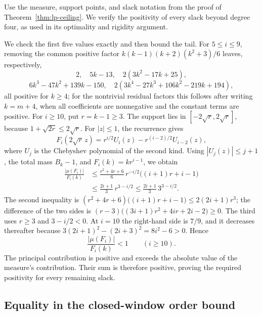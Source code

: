 \documentclass[a4paper,10pt,reqno]{amsart}
\theoremstyle{plain}
\theoremstyle{definition}
\theoremstyle{remark}
\begin{document}
Use the measure, support points, and slack notation from the proof of
Theorem~\ref{thm:lp-ceiling}.  We verify the positivity of every slack beyond
degree four, as used in its optimality and rigidity argument.

We check the first five values exactly and then
bound the tail.  For \(5\le i\le9\), removing the common positive factor
\(k(k-1)(k+2)(k^2+3)/6\) leaves, respectively,
\[
 2,\quad 5k-13,\quad 2(3k^2-17k+25),
\]
\[
 6k^3-47k^2+139k-150,
 \quad
 2(3k^4-27k^3+106k^2-219k+194),
\]
all positive for \(k\ge4\); for the nontrivial residual factors this follows
after writing \(k=m+4\), when all coefficients are nonnegative and the
constant terms are positive.  For \(i\ge10\), put \(r=k-1\ge3\).
The support lies in \([-2\sqrt r,2\sqrt r]\), because
\(1+\sqrt{2r}\le2\sqrt r\).  For \(|z|\le1\), the recurrence gives
\[
 F_i(2\sqrt r\,z)
 =r^{i/2}U_i(z)-r^{(i-2)/2}U_{i-2}(z),
\]
where \(U_j\) is the Chebyshev polynomial of the second kind.
Using \(|U_j(z)|\le j+1\), the total mass \(B_k-1\), and
\(F_i(k)=kr^{i-1}\), we obtain
\[
\begin{aligned}
 \frac{|\mu(F_i)|}{F_i(k)}
 &\le \frac{r^2+4r+6}{6}\,r^{-i/2}\bigl((i+1)r+i-1\bigr)\\
 &\le \frac{2i+1}{3}\,r^{3-i/2}
 \le \frac{2i+1}{3}\,3^{3-i/2}.
\end{aligned}
\]
The second inequality is
\((r^2+4r+6)\bigl((i+1)r+i-1\bigr)\le2(2i+1)r^3\); the difference of the two
sides is \((r-3)\bigl((3i+1)r^2+4ir+2i-2\bigr)\ge0\). The third uses
\(r\ge3\) and \(3-i/2<0\).
At \(i=10\) the right-hand side is \(7/9\), and it decreases thereafter
because \(3(2i+1)^2-(2i+3)^2=8i^2-6>0\).  Hence
\[
 \frac{|\mu(F_i)|}{F_i(k)}<1\qquad(i\ge10).
\]
The principal contribution is positive and exceeds the absolute value of
the measure's contribution. Their sum is therefore positive, proving the
required positivity for every remaining slack.

\subsection{Equality in the closed-window order bound}
\end{document}
